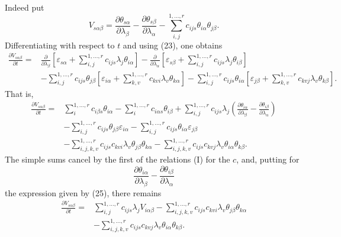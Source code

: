 \documentclass[11pt]{book}
\begin{document}
Indeed put
\begin{equation*}\tag{25}
 V_{s\alpha\beta}=\frac{\partial\theta_{s\alpha}}{\partial\lambda_\beta}
 -\frac{\partial\theta_{s\beta}}{\partial\lambda_\alpha}
 -\sum\limits_{i,j}^{1,\ldots,r}c_{ijs}\theta_{i\alpha}\theta_{j\beta}.
\end{equation*}
Differentiating with respect to $t$ and using (23), one obtains
\[
\begin{split}
\frac{\partial V_{s\alpha\beta}}{\partial t}={}&
\frac{\partial}{\partial\lambda_\beta}
 \left[\varepsilon_{s\alpha}+\sum\limits_{i,j}^{1,\ldots,r}c_{ijs}\lambda_j\theta_{i\alpha}\right]
-\frac{\partial}{\partial\lambda_\alpha}
 \left[\varepsilon_{s\beta}+\sum\limits_{i,j}^{1,\ldots,r}c_{ijs}\lambda_j\theta_{i\beta}\right]                 \\
&-\sum\limits_{i,j}^{1,\ldots,r}c_{ijs}\theta_{j\beta}
 \left[\varepsilon_{i\alpha}+\sum\limits_{k,v}^{1,\ldots,r}c_{kvi}\lambda_v\theta_{k\alpha}\right]
-\sum\limits_{i,j}^{1,\ldots,r}c_{ijs}\theta_{i\alpha}
 \left[\varepsilon_{j\beta}+\sum\limits_{k,v}^{1,\ldots,r}c_{kvj}\lambda_v\theta_{k\beta}\right].
\end{split}
\]
That is,
\[
\begin{split}
\frac{\partial V_{s\alpha\beta}}{\partial t}={}&
 \sum\limits_i^{1,\ldots,r} c_{i\beta s}\theta_{i\alpha}
-\sum\limits_i^{1,\ldots,r} c_{i\alpha s}\theta_{i\beta}
+\sum\limits_{i,j}^{1,\ldots,r}c_{ijs}\lambda_j
 \left(\frac{\partial\theta_{i\alpha}}{\partial\lambda_\beta}
      -\frac{\partial\theta_{i\beta}}{\partial\lambda_\alpha}\right)                         \\
&-\sum\limits_{i,j}^{1,\ldots,r}c_{ijs}\theta_{j\beta}\varepsilon_{i\alpha}
-\sum\limits_{i,j}^{1,\ldots,r}c_{ijs}\theta_{i\alpha}\varepsilon_{j\beta} \\
&-\sum\limits_{i,j,k,v}^{1,\ldots,r}c_{ijs}c_{kvi}\lambda_v\theta_{j\beta}\theta_{k\alpha}
-\sum\limits_{i,j,k,v}^{1,\ldots,r}c_{ijs}c_{kvj}\lambda_v\theta_{i\alpha}\theta_{k\beta}.
\end{split}
\]
The simple sums cancel by the first of the relations (I) for the $c$, and, putting for
\[
 \frac{\partial\theta_{i\alpha}}{\partial\lambda_\beta}
 -\frac{\partial\theta_{i\beta}}{\partial\lambda_\alpha}
\]
the expression given by (25), there remains
\[
\begin{split}
\frac{\partial V_{s\alpha\beta}}{\partial t}={}&
 \sum\limits_{i,j}^{1,\ldots,r}c_{ijs}\lambda_jV_{i\alpha\beta}
-\sum\limits_{i,j,k,v}^{1,\ldots,r}c_{ijs}c_{kvi}\lambda_v\theta_{j\beta}\theta_{k\alpha}  \\
&-\sum\limits_{i,j,k,v}^{1,\ldots,r}c_{ijs}c_{kvj}\lambda_v\theta_{i\alpha}\theta_{k\beta}.
\end{split}
\]
\end{document}
